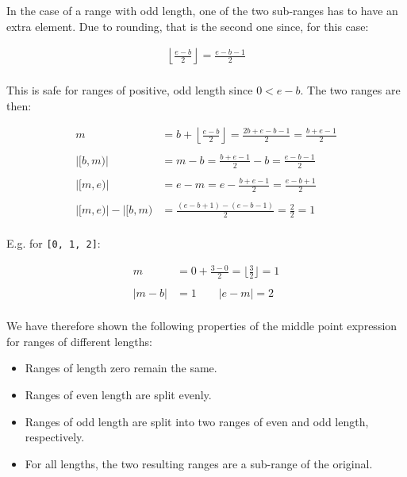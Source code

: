 In the case of a range with odd length, one of the two sub-ranges has to have an
extra element.  Due to rounding, that is the second one since, for this case:

\begin{align*}
    \left\lfloor \frac{e - b}{2} \right\rfloor = \frac{e - b - 1}{2} \\
\end{align*}

This is safe for ranges of positive, odd length since $0 < e - b$.  The two
ranges are then:

\begin{align*}
                     m &= b + \left\lfloor \frac{e - b}{2} \right\rfloor
                        = \frac{2b + e - b - 1}{2}
                        = \frac{b + e - 1}{2} \\\\
              |[b, m)| &= m - b
                        = \frac{b + e - 1}{2} - b
                        = \frac{e - b - 1}{2} \\\\
              |[m, e)| &= e - m
                        = e - \frac{b + e - 1}{2}
                        = \frac{e - b + 1}{2} \\\\
    |[m, e)| - |[b, m) &= \frac{(e - b + 1) - (e - b - 1)}{2}
                        = \frac{2}{2}
                        = 1 \\
\end{align*}

E.g. for \texttt{[0, 1, 2]}:

\begin{align*}
          m &= 0 + \frac{3 - 0}{2}
             = \bigg \lfloor \frac{3}{2} \bigg \rfloor
             = 1 \\\\
    |m - b| &= 1 \qquad |e - m|
             = 2 \\
\end{align*}

We have therefore shown the following properties of the middle point expression
for ranges of different lengths:

\begin{itemize}
    \item Ranges of length zero remain the same.
    \item Ranges of even length are split evenly.
    \item
        Ranges of odd length are split into two ranges of even and odd length,
        respectively.
    \item
        For all lengths, the two resulting ranges are a sub-range of the
        original.
\end{itemize}

